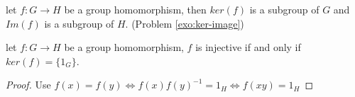 

\begin{boxedProposition} \label{prop:injective-criteria}
let $f: G \longrightarrow H$ be a group homomorphism, then $ker(f)$ is a subgroup of $G$ and $Im(f)$ is a subgroup of $H$. (Problem \ref{exo:ker-image})
\end{boxedProposition}

\begin{proposition*}
    let $f: G\longrightarrow H$ be a group homomorphism, $f$ is injective if and only if $ker(f) = \{1_G\}$. 
\end{proposition*}
\begin{proof}
    Use $f(x) = f(y) \iff f(x)f(y)^{-1} = 1_H \iff f(xy) = 1_H$
\end{proof}

